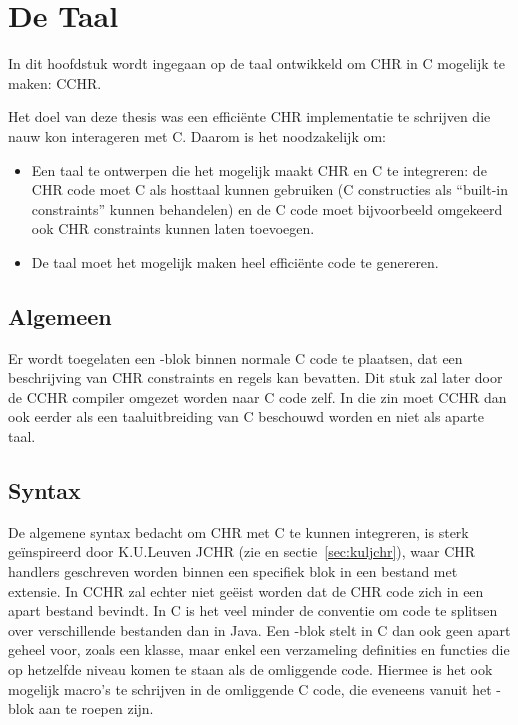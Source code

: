 \chapter{De Taal} \label{chap:taal}

In dit hoofdstuk wordt ingegaan op de taal ontwikkeld om CHR in C mogelijk te maken: CCHR.

Het doel van deze thesis was een effici\"ente CHR implementatie te schrijven die nauw kon interageren met C. Daarom is het noodzakelijk om: \begin{itemize}
  \item Een taal te ontwerpen die het mogelijk maakt CHR en C te integreren: de CHR code moet C
        als hosttaal kunnen gebruiken (C constructies als ``built-in constraints'' kunnen
	behandelen) en de C code moet bijvoorbeeld omgekeerd ook CHR constraints kunnen laten toevoegen.
  \item De taal moet het mogelijk maken heel effici\"ente code te genereren.
\end{itemize}

\section{Algemeen} \label{sec:taal-gen}

Er wordt toegelaten een -blok binnen normale C code te plaatsen, dat een beschrijving van CHR constraints en regels kan bevatten. Dit stuk zal later door de CCHR compiler omgezet worden naar C code zelf. In die zin moet CCHR dan ook eerder als een taaluitbreiding van C beschouwd worden en niet als aparte taal. 

\section{Syntax} \label{sec:taal-syn}

De algemene syntax bedacht om CHR met C te kunnen integreren, is sterk ge\"inspireerd door K.U.Leuven JCHR (zie \cite{peter:jchr} en sectie~\ref{sec:kuljchr}), waar CHR handlers geschreven worden binnen een specifiek blok in een bestand met  extensie. In CCHR zal echter niet ge\"eist worden dat de CHR code zich in een apart bestand bevindt. In C is het veel minder de conventie om code te splitsen over verschillende bestanden dan in Java. Een -blok stelt in C dan ook geen apart geheel voor, zoals een klasse, maar enkel een verzameling definities en functies die op hetzelfde niveau komen te staan als de omliggende code. Hiermee is het ook mogelijk macro's te schrijven in de omliggende C code, die eveneens vanuit het -blok aan te roepen zijn.

